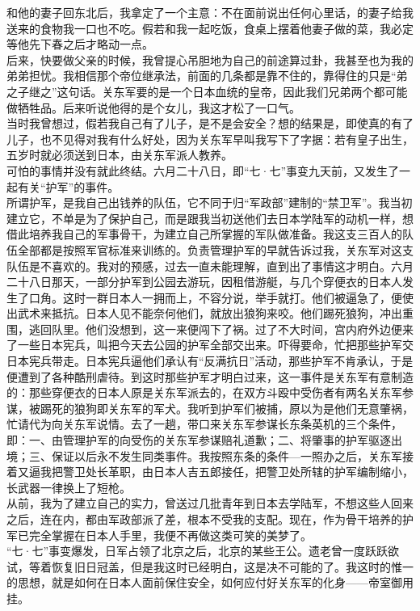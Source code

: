 和他的妻子回东北后，我拿定了一个主意：不在面前说出任何心里话，的妻子给我送来的食物我一口也不吃。假若和我一起吃饭，食桌上摆着他妻子做的菜，我必定等他先下春之后才略动一点。\\

后来，快要做父亲的时候，我曾提心吊胆地为自己的前途算过卦，我甚至也为我的弟弟担忧。我相信那个帝位继承法，前面的几条都是靠不住的，靠得住的只是“弟之子继之”这句话。关东军要的是一个日本血统的皇帝，因此我们兄弟两个都可能做牺牲品。后来听说他得的是个女儿，我这才松了一口气。\\

当时我曾想过，假若我自己有了儿子，是不是会安全？想的结果是，即使真的有了儿子，也不见得对我有什么好处，因为关东军早叫我写下了字据：若有皇子出生，五岁时就必须送到日本，由关东军派人教养。\\

可怕的事情并没有就此终结。六月二十八日，即“七·七”事变九天前，又发生了一起有关“护军”的事件。\\

所谓护军，是我自己出钱养的队伍，它不同于归“军政部”建制的“禁卫军”。我当初建立它，不单是为了保护自己，而是跟我当初送他们去日本学陆军的动机一样，想借此培养我自己的军事骨干，为建立自己所掌握的军队做准备。我这支三百人的队伍全部都是按照军官标准来训练的。负责管理护军的早就告诉过我，关东军对这支队伍是不喜欢的。我对的预感，过去一直未能理解，直到出了事情这才明白。六月二十八日那天，一部分护军到公园去游玩，因租借游艇，与几个穿便衣的日本人发生了口角。这时一群日本人一拥而上，不容分说，举手就打。他们被逼急了，便使出武术来抵抗。日本人见不能奈何他们，就放出狼狗来咬。他们踢死狼狗，冲出重围，逃回队里。他们没想到，这一来便闯下了祸。过了不大时间，宫内府外边便来了一些日本宪兵，叫把今天去公园的护军全部交出来。吓得要命，忙把那些护军交日本宪兵带走。日本宪兵逼他们承认有“反满抗日”活动，那些护军不肯承认，于是便遭到了各种酷刑虐待。到这时那些护军才明白过来，这一事件是关东军有意制造的：那些穿便衣的日本人原是关东军派去的，在双方斗殴中受伤者有两名关东军参谋，被踢死的狼狗即关东军的军犬。我听到护军们被捕，原以为是他们无意肇祸，忙请代为向关东军说情。去了一趟，带口来关东军参谋长东条英机的三个条件，即：一、由管理护军的向受伤的关东军参谋赔礼道歉；二、将肇事的护军驱逐出境；三、保证以后永不发生同类事件。我按照东条的条件—一照办之后，关东军接着又逼我把警卫处长革职，由日本人吉五郎接任，把警卫处所辖的护军编制缩小，长武器一律换上了短枪。\\

从前，我为了建立自己的实力，曾送过几批青年到日本去学陆军，不想这些人回来之后，连在内，都由军政部派了差，根本不受我的支配。现在，作为骨干培养的护军已完全掌握在日本人手里，我便不再做这类可笑的美梦了。\\

“七·七”事变爆发，日军占领了北京之后，北京的某些王公。遗老曾一度跃跃欲试，等着恢复旧日冠盖，但是我这时已经明白，这是决不可能的了。我这时的惟一的思想，就是如何在日本人面前保住安全，如何应付好关东军的化身——帝室御用挂。
